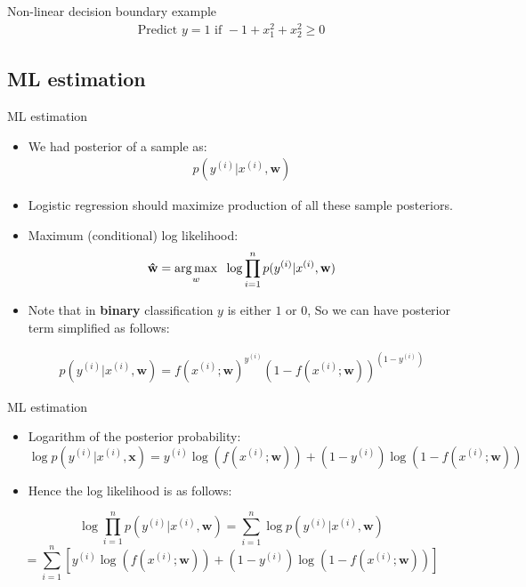 \documentclass[serif, aspectratio=169]{beamer}
\begin{document}
\begin{frame}{Non-linear decision boundary example}
    \begin{align*}
        \text{Predict } y=1 \text{ if } -1 + x_1^2 + x_2^2 \geq 0
    \end{align*}
    
\end{frame}
\subsection{ML estimation}

\begin{frame}{ML estimation}
    \begin{itemize}
        \item We had posterior of a sample as:
        \begin{align*}
            p(y^{(i)}|x^{(i)},\mathbf{w})
        \end{align*}
        \item Logistic regression should maximize production of all these sample posteriors.
        
        \item Maximum (conditional) log likelihood:
        \begin{align*}
             \mathbf{\hat{w}} = \underset{w}{\arg\max} \hspace{0.2cm} \log \prod_{i=1}^{n} p(y^{(i)}|x^{(i)},\mathbf{w})
        \end{align*}
        \item Note that in \textbf{binary} classification $y$ is either $1$ or $0$, So we can have posterior term simplified as follows:
        
        \begin{align*}
            p(y^{(i)}|x^{(i)},\mathbf{w})=f(x^{(i)}; \mathbf{w})^{y^{(i)}} (1 - f(x^{(i)}; \mathbf{w}))^{(1 - y^{(i)})}
        \end{align*}
    \end{itemize}
\end{frame}
\begin{frame}{ML estimation}
    \begin{itemize}
        \item Logarithm of the posterior probability:
            \[
            \log p(y^{(i)}|x^{(i)}, \mathbf{x})=
            y^{(i)}\log (f(x^{(i)}; \mathbf{w})) + 
            (1-y^{(i)})\log (1 - f(x^{(i)}; \mathbf{w}))
            \]
        \item Hence the log likelihood is as follows:
    \end{itemize}
    \[
    \log \prod _{i=1}^{n} p(y^{(i)}|x^{(i)}, \mathbf{w}) = \sum  _{i=1}^{n} \log p(y^{(i)}|x^{(i)}, \mathbf{w})
    \]
    \[
    = \sum_{i=1}^{n}[y^{(i)}\log (f(x^{(i)}; \mathbf{w})) + 
    (1-y^{(i)})\log (1 - f(x^{(i)}; \mathbf{w}))]
    \]
\end{frame}
\end{document}
